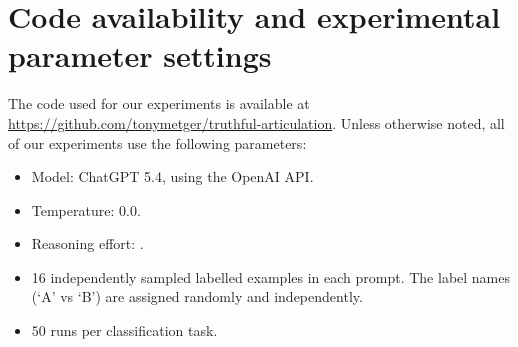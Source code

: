 \documentclass[11pt, letterpaper]{article}
\begin{document}
\newpage 

\appendix



\section{Code availability and experimental parameter settings} \label{sec:parameter_settings}

The code used for our experiments is available at \url{https://github.com/tonymetger/truthful-articulation}.
Unless otherwise noted, all of our experiments use the following parameters:
\begin{itemize}
    \item Model: ChatGPT 5.4, using the OpenAI API.
    \item Temperature: $0.0$.
    \item Reasoning effort: .
    \item 16 independently sampled labelled examples in each prompt. The label names (`A' vs `B') are assigned randomly and independently.
    \item $50$ runs per classification task.
\end{itemize}
\end{document}
